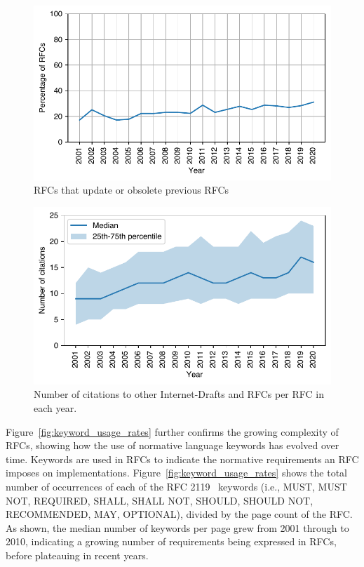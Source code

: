 \documentclass[twocolumn,10pt]{article}
\newlength{\figureWidthOneColumn}
\begin{document}
\begin{figure}
  \centering
  \includegraphics[width=\figureWidthOneColumn]{figures-prev/imc-2021/documents/update_obsolete_yearly_pct.pdf}
  \caption{
    RFCs that update or obsolete previous RFCs
  }
  \label{fig:updates_year}
\end{figure}

\begin{figure}
  \centering
  \includegraphics[width=\figureWidthOneColumn]{figures-prev/imc-2021/documents/cite_counts_yearly.pdf}
  \caption{
    Number of citations to other Internet-Drafts and RFCs per RFC in each
    year.
  }
  \label{fig:citations_year}
\end{figure}

Figure~\ref{fig:keyword_usage_rates} further confirms the growing complexity
of RFCs, showing how the use of normative language keywords has evolved
over time.  Keywords are used in RFCs to indicate the normative requirements
an RFC imposes on implementations. Figure~\ref{fig:keyword_usage_rates}
shows the total number of occurrences of each of the RFC 2119~\cite{RFC2119}
keywords (i.e., MUST, MUST NOT, REQUIRED, SHALL, SHALL NOT, SHOULD, SHOULD
NOT, RECOMMENDED, MAY, OPTIONAL), divided by the page count of the RFC. As
shown, the median number of keywords per page grew from 2001 through to
2010, indicating a growing number of requirements being expressed in RFCs,
before plateauing in recent years.
\end{document}
